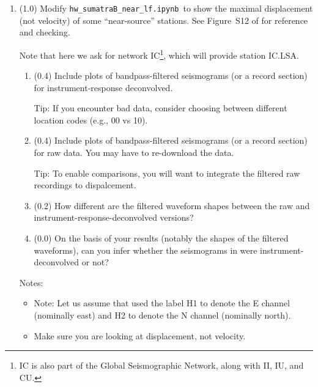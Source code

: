 \documentclass[11pt,titlepage,fleqn]{article}
\newcommand{\tfilenearlf}{{\tt hw\_sumatraB\_near\_lf.ipynb}}
\begin{document}
\begin{enumerate}
\item (1.0) Modify \tfilenearlf\ to show the maximal displacement (not velocity) of some ``near-source'' stations. See Figure~S12 of \citet{Ammon2005} for reference and checking.

Note that here we ask for network IC\footnote{IC is also part of the Global Seismographic Network, along with II, IU, and CU.}, which will provide station IC.LSA.

%
\begin{enumerate}
\item (0.4) Include plots of bandpass-filtered seismograms (or a record section) for instrument-response deconvolved.

Tip: If you encounter bad data, consider choosing between different location codes (e.g., 00 vs 10).

\item (0.4) Include plots of bandpass-filtered seismograms (or a record section) for raw data. You may have to re-download the data.

Tip: To enable comparisons, you will want to integrate the filtered raw recordings to dispalcement.

\item (0.2) How different are the filtered waveform shapes between the raw and instrument-response-deconvolved versions?

\item (0.0) On the basis of your results (notably the shapes of the filtered waveforms), can you infer whether the seismograms in \citet{Ammon2005} were instrument-deconvolved or not?
\end{enumerate}
%
\iffalse
Notes:
%
\begin{itemize}
\item Note: Let us assume that \citet{Ammon2005} used the label H1 to denote the E channel (nominally east) and H2 to denote the N channel (nominally north).

\item Make sure you are looking at displacement, not velocity.


\end{itemize}
\end{enumerate}
\end{document}
